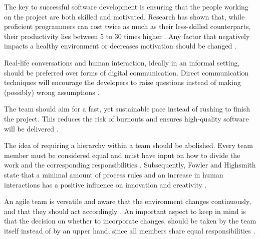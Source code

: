 The key to successful software development is ensuring that the people working on the project are both skilled and motivated. Research has shown that, while proficient programmers can cost twice as much as their less-skilled counterparts, their productivity lies between 5 to 30 times higher \cite{glass2001agile}. Any factor that negatively impacts a healthy environment or decreases motivation should be changed \cite[p.~34]{martin2014}.

Real-life conversations and human interaction, ideally in an informal setting, should be preferred over forms of digital communication. Direct communication techniques will encourage the developers to raise questions instead of making (possibly) wrong assumptions \cite{fowlerhighsmithagile,glass2001agile}.

The team should aim for a fast, yet sustainable pace instead of rushing to finish the project. This reduces the risk of burnouts and ensures high-quality software will be delivered \cite{martin2014}.

The idea of requiring a hierarchy within a team should be abolished. Every team member must be considered equal and must have input on how to divide the work and the corresponding responsibilities \cite{martin2014}. Subsequently, Fowler and Highsmith state that a minimal amount of process rules and an increase in human interactions has a positive influence on innovation and creativity \cite{fowlerhighsmithagile}. 

An agile team is versatile and aware that the environment changes continuously, and that they should act accordingly \cite{martin2014}. An important aspect to keep in mind is that the decision on whether to incorporate changes, should be taken by the team itself instead of by an upper hand, since all members share equal responsibilities \cite{glass2001agile}.


